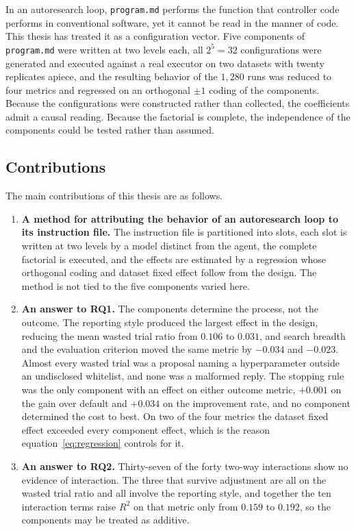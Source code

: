 \documentclass[11pt]{article}
\begin{document}
In an autoresearch loop, \texttt{program.md} performs the function that controller code performs in conventional software, yet it cannot be read in the manner of code. This thesis has treated it as a configuration vector. Five components of \texttt{program.md} were written at two levels each, all $2^5=32$ configurations were generated and executed against a real executor on two datasets with twenty replicates apiece, and the resulting behavior of the $1{,}280$ runs was reduced to four metrics and regressed on an orthogonal $\pm1$ coding of the components. Because the configurations were constructed rather than collected, the coefficients admit a causal reading. Because the factorial is complete, the independence of the components could be tested rather than assumed.

\subsection{Contributions}

The main contributions of this thesis are as follows.

\begin{enumerate}
\item \textbf{A method for attributing the behavior of an autoresearch loop to its instruction file.} The instruction file is partitioned into slots, each slot is written at two levels by a model distinct from the agent, the complete factorial is executed, and the effects are estimated by a regression whose orthogonal coding and dataset fixed effect follow from the design. The method is not tied to the five components varied here.
\item \textbf{An answer to RQ1.} The components determine the process, not the outcome. The reporting style produced the largest effect in the design, reducing the mean wasted trial ratio from $0.106$ to $0.031$, and search breadth and the evaluation criterion moved the same metric by $-0.034$ and $-0.023$. Almost every wasted trial was a proposal naming a hyperparameter outside an undisclosed whitelist, and none was a malformed reply. The stopping rule was the only component with an effect on either outcome metric, $+0.001$ on the gain over default and $+0.034$ on the improvement rate, and no component determined the cost to best. On two of the four metrics the dataset fixed effect exceeded every component effect, which is the reason equation~\eqref{eq:regression} controls for it.
\item \textbf{An answer to RQ2.} Thirty-seven of the forty two-way interactions show no evidence of interaction. The three that survive adjustment are all on the wasted trial ratio and all involve the reporting style, and together the ten interaction terms raise $R^2$ on that metric only from $0.159$ to $0.192$, so the components may be treated as additive.
\end{enumerate}
\end{document}

